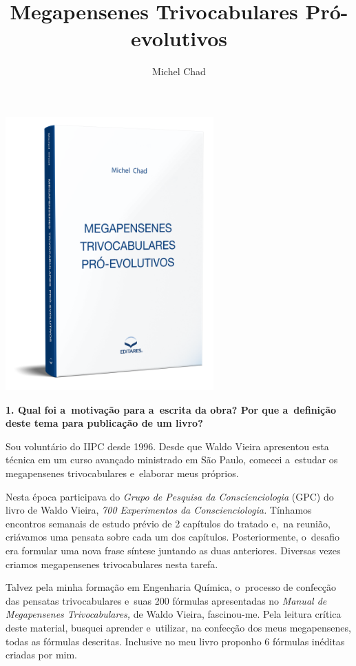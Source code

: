 \documentclass{gescons}
\author{Michel Chad}
\title{Megapensenes Trivocabulares Pró-evolutivos}
\begin{document}
    \makeentrevistatitle

    \begin{multicols}{2}



\begin{center}
    \includegraphics[width=8cm]{articles/entrevista/mockups/Michel-Chad.png}
\end{center}

\textbf{1.       Qual foi a~motivação para a~escrita da obra? Por que a~definição deste tema para publicação de um livro?}

Sou voluntário do IIPC desde 1996. Desde que Waldo Vieira apresentou esta técnica em um curso avançado ministrado em São Paulo, comecei a~estudar os megapensenes trivocabulares e~elaborar meus próprios. 

Nesta época participava do \textit{Grupo de Pesquisa da Conscienciologia} (GPC) do livro de Waldo Vieira,  \textit{700 Experimentos da Conscienciologia.} Tínhamos encontros semanais de estudo prévio de 2 capítulos do tratado e,~na reunião, criávamos uma pensata sobre cada um dos capítulos. Posteriormente, o~desafio era formular uma nova frase síntese juntando as duas anteriores. Diversas vezes criamos megapensenes trivocabulares nesta tarefa. 

Talvez pela minha formação em Engenharia Química, o~processo de confecção das pensatas trivocabulares e~suas 200 fórmulas apresentadas no
\textit{Manual de Megapensenes Trivocabulares,} de Waldo Vieira,  fascinou-me. Pela leitura crítica deste material, busquei aprender e~utilizar, na confecção dos meus megapensenes, todas as fórmulas descritas. Inclusive no meu livro proponho 6 fórmulas inéditas criadas por mim.


\end{multicols}
\end{document}
